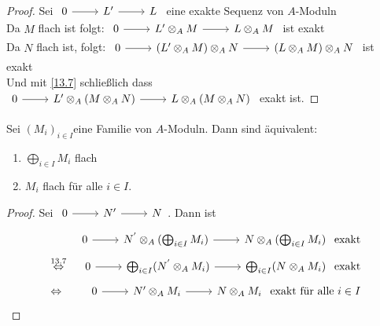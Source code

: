 \begin{proof}
	Sei $\begin{tikzcd}
	0 \arrow{r} & L' \arrow{r} & L \end{tikzcd}$ eine exakte Sequenz von $A$-Moduln \\
	Da $M$ flach ist folgt: $\begin{tikzcd}	0 \arrow{r} & L' \otimes_A M \arrow{r} & L \otimes_A M \end{tikzcd}$ ist exakt \\
	Da $N$ flach ist, folgt: 
	$\begin{tikzcd}	0 \arrow{r} & (L' \otimes_A M) \otimes_A N\arrow{r} & (L \otimes_A M) \otimes_A N \end{tikzcd}$ ist exakt \\
	Und mit \ref{13.7} schließlich dass
	$\begin{tikzcd}	0 \arrow{r} & L' \otimes_A (M \otimes_A N) \arrow{r} & L \otimes_A( M \otimes_A N) \end{tikzcd}$ exakt ist.
	
\end{proof}
\begin{bem} \label{13.20}
	Sei $(M_i)_{i \in I } $eine Familie von $A$-Moduln. Dann sind äquivalent: 
	\begin{enumerate} [label= \roman*)]
		\item $\bigoplus_{i \in I} M_i $ flach
		\item $M_i $ flach für alle $i \in I$.
	\end{enumerate}
\end{bem}
\begin{proof}
	Sei $\begin{tikzcd} 0 \arrow{r} & N' \arrow{r} & N \end{tikzcd}$. Dann ist \\
	\begin{eqnarray*}
	& &	\begin{tikzcd}
	0 \arrow{r} & N^{'}\otimes_A (\bigoplus_{i \in I} M_i) \arrow{r} & N \otimes_A (\bigoplus_{i \in I} M_i) \end{tikzcd} \text{ exakt} \\
	&\overset{13.7}{\Lra}& \begin{tikzcd}
	0 \arrow{r} & \bigoplus_{i \in I} (N^{'}\otimes_A M_i) \arrow{r} & \bigoplus_{i \in I} (N^{}\otimes_A M_i) \end{tikzcd} \text{ exakt}\\
	&\Lra& \begin{tikzcd} 0 \arrow{r} & N' \otimes_A M_i \arrow{r} & N \otimes_A M_i \end{tikzcd} \text{ exakt für alle }i \in I
\end{eqnarray*}
\end{proof}

